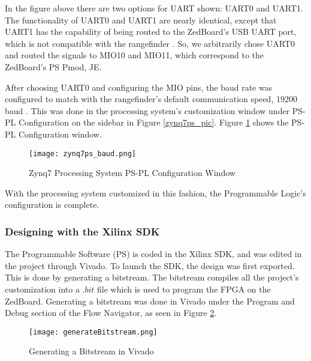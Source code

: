 In the figure above there are two options for UART shown: UART0 and UART1. The functionality of UART0 and UART1 are nearly identical, except that UART1 has the capability of being routed to the ZedBoard's USB UART port, which is not compatible with the rangefinder \cite{zedboard_datasheet}. So, we arbitrarily chose UART0 and routed the signals to MIO10 and MIO11, which correspond to the ZedBoard's PS Pmod, JE.
\par
After choosing UART0 and configuring the MIO pins, the baud rate was configured to match with the rangefinder's default communication speed, 19200 baud \cite{urg04lx_datasheet}. This was done in the processing system's customization window under PS-PL Configuration on the sidebar in Figure \ref{zynq7ps_pic}. Figure \ref{zynq7ps_baud_pic} shows the PS-PL Configuration window.

\begin{figure}[H]
	\centerline{\texttt{[image: zynq7ps\_baud.png]}}
	\caption{Zynq7 Processing System PS-PL Configuration Window}
	\label{zynq7ps_baud_pic}
\end{figure}

With the processing system customized in this fashion, the Programmable Logic's configuration is complete.

\subsubsection{Designing with the Xilinx SDK}
The Programmable Software (PS) is coded in the Xilinx SDK, and was edited in the project through Vivado. To launch the SDK, the design was first exported. This is done by generating a bitstream. The bitstream compiles all the project's customization into a $.bit$ file which is used to program the FPGA on the ZedBoard. Generating a bitstream was done in Vivado under the Program and Debug section of the Flow Navigator, as seen in Figure \ref{generateBitstream}.

\begin{figure}[H]
	\centerline{\texttt{[image: generateBitstream.png]}}
	\caption{Generating a Bitstream in Vivado}
	\label{generateBitstream}
\end{figure}

